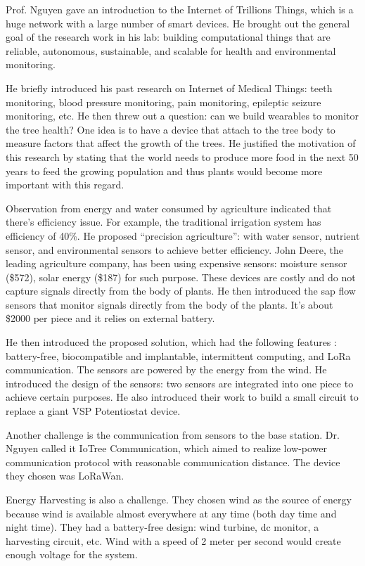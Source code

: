 \documentclass[11pt, oneside]{article}   	%
\begin{document}
Prof. Nguyen gave an introduction to the Internet of Trillions Things, which is a huge network with a large number of smart devices. He brought out the general goal of the research work in his lab:  building computational things that are reliable, autonomous, sustainable, and scalable for health and environmental monitoring. 

He briefly introduced his past research on Internet of Medical Things: teeth monitoring, blood pressure monitoring, pain monitoring, epileptic seizure monitoring, etc.
He then threw out a question: can we build wearables to monitor the tree health? One idea is to have a device that attach to the tree body to measure factors that affect the growth of the trees. He justified the motivation of this research by stating that the world needs to produce more food in the next 50 years to feed the growing population and thus plants would become more important with this regard.

Observation from energy and water consumed by agriculture indicated that there's efficiency issue. For example, the traditional irrigation system has efficiency of 40\%. He proposed ``precision agriculture'': with water sensor, nutrient sensor, and environmental sensors to achieve better efficiency. John Deere, the leading agriculture company, has been using expensive sensors: moisture sensor (\$572), solar energy (\$187) for such purpose.  These devices are costly and do not capture signals directly from the body of plants.  He then introduced the sap flow sensors that monitor signals directly from the body of the plants. It's about \$2000 per piece and it relies on external battery. 

He then introduced the proposed solution, which  had the following features : battery-free, biocompatible and implantable, intermittent computing, and LoRa communication. The sensors are powered by the energy from the wind. He introduced the design of the sensors: two sensors are integrated into one piece to achieve certain purposes. He also introduced their work to build a small circuit to replace a giant VSP Potentiostat device. 

Another challenge is the communication from sensors to the base station. Dr. Nguyen called it IoTree Communication, which aimed to realize low-power communication protocol with reasonable communication distance. The device they chosen was LoRaWan. 

Energy Harvesting is also a challenge. They chosen wind as the source of energy because wind is available almost everywhere at any time (both day time and night time). They had a battery-free design: wind turbine, dc monitor, a harvesting circuit, etc. Wind with a speed of 2 meter per second  would create enough voltage for the system.
\end{document}
